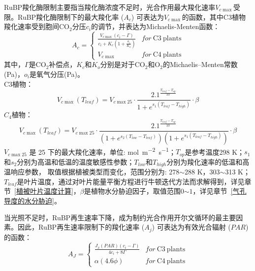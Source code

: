 RuBP羧化酶限制主要指当羧化酶浓度不足时，光合作用最大羧化速率$V_{c \max }$受限。RuBP羧化酶限制下的最大羧化率 ($A_c$) 可表达为$V_{c \max }$的函数，其中C3植物羧化速率受到胞间CO$_2$分压$c_i$的调节，并表达为Michaelis-Menten函数：
\begin{equation}\label{A_C1}
A_{c}=\left\{\begin{array}{ll}\frac{V_{c \max }\left(c_{i}-\Gamma\right)}{c_{i}+K_{c}\left(1+\frac{o_{i}}{K_{o}}\right)}
     & { for\ } \mathrm{ C3\ } \mathrm{ plants } \\ V_{c \max } & { for\ } \mathrm{ C4\ } \mathrm{ plants }\end{array}\right.
\end{equation}
其中，$\Gamma$是CO$_2$补偿点，$K_c$和$K_o$分别是对于CO$_2$和O$_2$的Michaelis--Menten常数(Pa)，$o_i$是氧气分压(Pa)。\\
C3植物：\\
\begin{equation}\label{V_cmax_a}
V_{c \max }\left(T_{{leaf }}\right)=V_{c \max 25} \cdot \frac{2.1^{\frac{T_{{leaf }}-T_{o p}}{10}}}{1+e^{s_{1}\left(T_{{leaf }}-T_{{high }}\right)}} \cdot \beta
\end{equation}
$C_4$植物：\\
\begin{equation}\label{V_cmax_b}
V_{c \max }\left(T_{{leaf }}\right)=V_{c \max 25} \cdot \frac{2.1^{\frac{T_{{leaf }}-T_{o p}}{10}}}{\left(1+e^{s_{2}\left(T_{{low }}
 - T_{{leaf }}\right)}\right)\left(1+e^{s_{1}\left(T_{{leaf }}-T_{h i g h}\right)}\right)} \cdot \beta
\end{equation}
$V_{c \max 25}$ 是 25 \textcelsius 下的最大羧化速率，单位: \unit{mol.m^{-2}.s^{-1}}；$T_{op}$是参考温度298 K；$s_1$和$s_2$分别为高温和低温的温度敏感性参数；$T_{low}$和$T_{high}$分别为羧化速率的低温和高温响应参数，
取值根据植被类型而变化，范围分别为: 278$\sim$288 K，303$\sim$313 K；$T_{leaf}$是叶片温度，通过对叶片能量平衡方程进行牛顿迭代方法而求解得到，详见章节~\ref{植被叶片温度计算}，$\beta$是植物水分胁迫因子，取值范围0$\sim1$，详见章节~\ref{气孔导度的水分胁迫}。

当光照不足时，RuBP再生速率下降，成为制约光合作用开尔文循环的最主要因素。因此，RuBP再生速率限制下的羧化速率 ($A_j$) 可表达为有效光合辐射 ($PAR$) 的函数：
\begin{equation}\label{A_J1}
A_{J}=\left\{\begin{array}{ll}\frac{J_x\left(PAR\right)\left(c_{i}-\Gamma\right)}{4c_{i}+8\Gamma}
     & { for\ } \mathrm{ C3\ } \mathrm{ plants } \\ \alpha\left(4.6\phi\right) & { for\ } \mathrm{ C4\ } \mathrm{ plants }\end{array}\right.
\end{equation}

